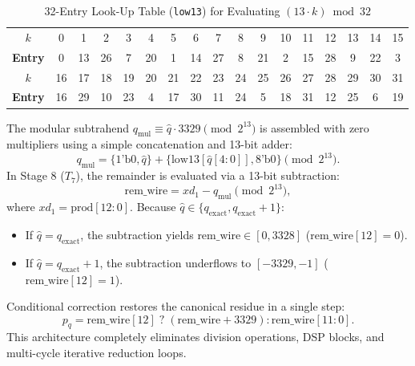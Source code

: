\begin{table}[!t]
\caption{32-Entry Look-Up Table (\texttt{low13}) for Evaluating $(13 \cdot k) \bmod 32$}
\label{tab:low13_lut}
\centering
\scriptsize
\setlength{\tabcolsep}{3.5pt}
\begin{tabular}{ccccccccccccccccc}
\toprule
$k$ & 0 & 1 & 2 & 3 & 4 & 5 & 6 & 7 & 8 & 9 & 10 & 11 & 12 & 13 & 14 & 15 \\
\textbf{Entry} & 0 & 13 & 26 & 7 & 20 & 1 & 14 & 27 & 8 & 21 & 2 & 15 & 28 & 9 & 22 & 3 \\
\midrule
$k$ & 16 & 17 & 18 & 19 & 20 & 21 & 22 & 23 & 24 & 25 & 26 & 27 & 28 & 29 & 30 & 31 \\
\textbf{Entry} & 16 & 29 & 10 & 23 & 4 & 17 & 30 & 11 & 24 & 5 & 18 & 31 & 12 & 25 & 6 & 19 \\
\bottomrule
\end{tabular}
\end{table}

The modular subtrahend $q_{\text{mul}} \equiv \hat{q} \cdot 3329 \pmod{2^{13}}$ is assembled with zero multipliers using a simple concatenation and 13-bit adder:
\begin{equation}
\label{eq:qmul_assembly_hw}
q_{\text{mul}} = \{1\text{'b0}, \hat{q}\} + \{\text{low13}[\hat{q}[4:0]], 8\text{'b0}\} \pmod{2^{13}}.
\end{equation}
In Stage 8 ($T_7$), the remainder is evaluated via a 13-bit subtraction:
\begin{equation}
\label{eq:rem_calc_hw}
\text{rem\_wire} = xd_1 - q_{\text{mul}} \pmod{2^{13}},
\end{equation}
where $xd_1 = \text{prod}[12:0]$. Because $\hat{q} \in \{q_{\text{exact}}, q_{\text{exact}} + 1\}$:
\begin{itemize}
    \item If $\hat{q} = q_{\text{exact}}$, the subtraction yields $\text{rem\_wire} \in [0, 3328]$ ($\text{rem\_wire}[12] = 0$).
    \item If $\hat{q} = q_{\text{exact}} + 1$, the subtraction underflows to $[-3329, -1]$ ($\text{rem\_wire}[12] = 1$).
\end{itemize}
Conditional correction restores the canonical residue in a single step:
\begin{equation}
\label{eq:canonical_p_hw}
p_q = \text{rem\_wire}[12] \; ? \; (\text{rem\_wire} + 3329) : \text{rem\_wire}[11:0].
\end{equation}
This architecture completely eliminates division operations, DSP blocks, and multi-cycle iterative reduction loops.


